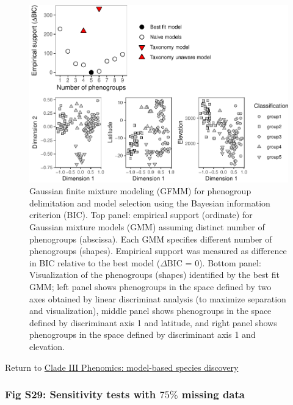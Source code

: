 \documentclass[
  11pt,
]{article}
\begin{document}
\begin{figure}
\includegraphics{Supplementary_Material_files/figure-latex/cladeIIImorphologicalDelimitationPlots-1} \caption{Gaussian finite mixture modeling (GFMM) for phenogroup delimitation and model selection using the Bayesian information criterion (BIC). Top panel: empirical support (ordinate) for Gaussian mixture models (GMM) assuming distinct number of phenogroups (abscissa). Each GMM specifies different number of phenogroups (shapes). Empirical support was measured as difference in BIC relative to the best model ($\Delta$BIC = $0$). Bottom panel: Visualization of the phenogroups (shapes) identified by the best fit GMM; left panel shows phenogroups in the space defined by two axes obtained by linear discriminat analysis (to maximize separation and visualization), middle panel shows phenogroups in the space defined by discriminant axis 1 and latitude, and right panel shows phenogroups in the space defined by discriminant axis 1 and elevation.}\label{fig:cladeIIImorphologicalDelimitationPlots}
\end{figure}

Return to \protect\hyperlink{model-based-species-discovery-4}{Clade III Phenomics: model-based species discovery}
\pagebreak

\hypertarget{fig-s29-sensitivity-tests-with-75-missing-data}{%
\subsubsection{\texorpdfstring{Fig S29: Sensitivity tests with \(75\%\) missing data}{Fig S29: Sensitivity tests with 75\textbackslash\% missing data}}\label{fig-s29-sensitivity-tests-with-75-missing-data}}
\end{document}
